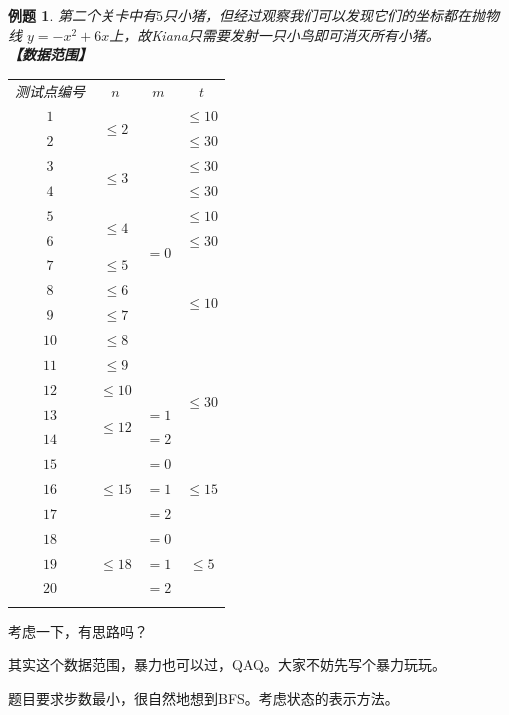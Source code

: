 \documentclass{article}
\newcommand{\mr}[2]{\multirow{#1}{*}{#2}}
\newtheorem{example}{例题}[subsection]
\theoremstyle{nonumberplain}
\begin{document}
\begin{example}
第二个关卡中有$5$只小猪，但经过观察我们可以发现它们的坐标都在抛物线 $y = -x^2 + 6x$上，故Kiana只需要发射一只小鸟即可消灭所有小猪。
\ \\
\textbf{【数据范围】}
\begin{center}
\begin{tabular}{c|c|c|c}
\Xhline{1.2pt}
测试点编号&$n$&$m$&$t$\\
\Xhline{1.2pt}
$1$&\multirow{2}{*}{$\leq 2$}&\multirow{12}{*}{$=0$}&$\leq 10$\\
\cline{1-1}\cline{4-4}
$2$&&&$\leq 30$\\
\cline{1-2}\cline{4-4}
$3$&\mr{2}{$\leq 3$}&&$\leq 30$\\
\cline{1-1}\cline{4-4}
$4$&&&$\leq 30$\\
\cline{1-2}\cline{4-4}
$5$&\mr{2}{$\leq 4$}&&$\leq 10$\\
\cline{1-1}\cline{4-4}
$6$&&&$\leq 30$\\
\cline{1-2}\cline{4-4}
$7$&$\leq 5$&&\mr{4}{$\leq 10$}\\
\cline{1-2}
$8$&$\leq 6$&&\\
\cline{1-2}
$9$&$\leq 7$&&\\
\cline{1-2}
$10$&$\leq 8$&&\\
\cline{1-2}\cline{4-4}
$11$&$\leq 9$&&\mr{4}{$\leq 30$}\\
\cline{1-2}
$12$&$\leq 10$&&\\
\cline{1-3}
$13$&\mr{2}{$\leq 12$}&$=1$&\\
\cline{1-1}\cline{3-3}
$14$&&$=2$&\\
\cline{1-4}
$15$&\mr{3}{$\leq 15$}&$=0$&\mr{3}{$\leq 15$}\\
\cline{1-1}\cline{3-3}
$16$&&$=1$&\\
\cline{1-1}\cline{3-3}
$17$&&$=2$&\\
\cline{1-4}
$18$&\mr{3}{$\leq 18$}&$=0$&\mr{3}{$\leq 5$}\\
\cline{1-1}\cline{3-3}
$19$&&$=1$&\\
\cline{1-1}\cline{3-3}
$20$&&$=2$&\\
\Xhline{1.2pt}
\end{tabular}
\end{center}
\end{example}

考虑一下，有思路吗？

其实这个数据范围，暴力也可以过，QAQ。大家不妨先写个暴力玩玩。

题目要求步数最小，很自然地想到BFS。考虑状态的表示方法。
\fi%
\end{document}
